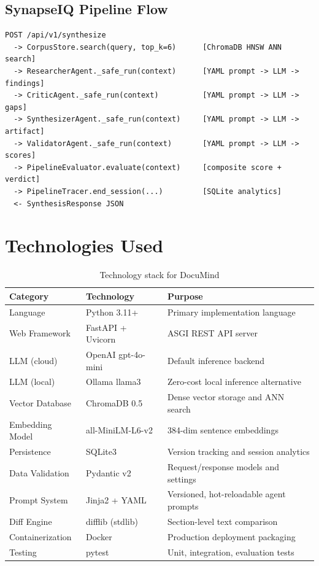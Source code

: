 \documentclass[12pt,letterpaper]{article}
\begin{document}
\subsection{SynapseIQ Pipeline Flow}

\begin{lstlisting}[caption={SynapseIQ multi-agent pipeline}]
POST /api/v1/synthesize
  -> CorpusStore.search(query, top_k=6)      [ChromaDB HNSW ANN search]
  -> ResearcherAgent._safe_run(context)      [YAML prompt -> LLM -> findings]
  -> CriticAgent._safe_run(context)          [YAML prompt -> LLM -> gaps]
  -> SynthesizerAgent._safe_run(context)     [YAML prompt -> LLM -> artifact]
  -> ValidatorAgent._safe_run(context)       [YAML prompt -> LLM -> scores]
  -> PipelineEvaluator.evaluate(context)     [composite score + verdict]
  -> PipelineTracer.end_session(...)         [SQLite analytics]
  <- SynthesisResponse JSON
\end{lstlisting}

\section{Technologies Used}

\begin{table}[h!]
\centering
\begin{tabular}{L{2.8cm} L{4.2cm} L{6.8cm}}
\toprule
\textbf{Category} & \textbf{Technology} & \textbf{Purpose} \\
\midrule
Language         & Python 3.11+           & Primary implementation language \\
Web Framework    & FastAPI + Uvicorn      & ASGI REST API server \\
LLM (cloud)      & OpenAI gpt-4o-mini     & Default inference backend \\
LLM (local)      & Ollama llama3          & Zero-cost local inference alternative \\
Vector Database  & ChromaDB 0.5           & Dense vector storage and ANN search \\
Embedding Model  & all-MiniLM-L6-v2      & 384-dim sentence embeddings \\
Persistence      & SQLite3                & Version tracking and session analytics \\
Data Validation  & Pydantic v2            & Request/response models and settings \\
Prompt System    & Jinja2 + YAML          & Versioned, hot-reloadable agent prompts \\
Diff Engine      & difflib (stdlib)       & Section-level text comparison \\
Containerization & Docker                 & Production deployment packaging \\
Testing          & pytest                 & Unit, integration, evaluation tests \\
\bottomrule
\end{tabular}
\caption{Technology stack for DocuMind}
\end{table}
\end{document}

